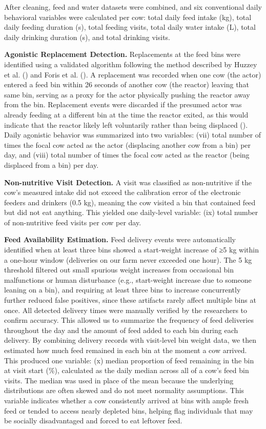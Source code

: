 \documentclass[
]{article}
\begin{document}
After cleaning, feed and water datasets were combined, and six
conventional daily behavioral variables were calculated per cow: total
daily feed intake (kg), total daily feeding duration (s), total feeding
visits, total daily water intake (L), total daily drinking duration (s),
and total drinking visits.

\textbf{Agonistic Replacement Detection.} Replacements at the feed bins
were identified using a validated algorithm following the method
described by Huzzey et al. ()
and Foris et al. (). A
replacement was recorded when one cow (the actor) entered a feed bin
within 26 seconds of another cow (the reactor) leaving that same bin,
serving as a proxy for the actor physically pushing the reactor away
from the bin. Replacement events were discarded if the presumed actor
was already feeding at a different bin at the time the reactor exited,
as this would indicate that the reactor likely left voluntarily rather
than being displaced (). Daily agonistic behavior was summarized into two variables:
(vii) total number of times the focal cow acted as the actor (displacing
another cow from a bin) per day, and (viii) total number of times the
focal cow acted as the reactor (being displaced from a bin) per day.

\textbf{Non-nutritive Visit Detection.} A visit was classified as
non-nutritive if the cow's measured intake did not exceed the
calibration error of the electronic feeders and drinkers (0.5 kg),
meaning the cow visited a bin that contained feed but did not eat
anything. This yielded one daily-level variable: (ix) total number of
non-nutritive feed visits per cow per day.

\textbf{Feed Availability Estimation.} Feed delivery events were
automatically identified when at least three bins showed a start-weight
increase of ≥5 kg within a one-hour window (deliveries on our farm never
exceeded one hour). The 5 kg threshold filtered out small spurious
weight increases from occasional bin malfunctions or human disturbance
(e.g., start-weight increase due to someone leaning on a bin), and
requiring at least three bins to increase concurrently further reduced
false positives, since these artifacts rarely affect multiple bins at
once. All detected delivery times were manually verified by the
researchers to confirm accuracy. This allowed us to summarize the
frequency of feed deliveries throughout the day and the amount of feed
added to each bin during each delivery. By combining delivery records
with visit-level bin weight data, we then estimated how much feed
remained in each bin at the moment a cow arrived. This produced one
variable: (x) median proportion of feed remaining in the bin at visit
start (\%), calculated as the daily median across all of a cow's feed
bin visits. The median was used in place of the mean because the
underlying distributions are often skewed and do not meet normality
assumptions. This variable indicates whether a cow consistently arrived
at bins with ample fresh feed or tended to access nearly depleted bins,
helping flag individuals that may be socially disadvantaged and forced
to eat leftover feed.
\end{document}

